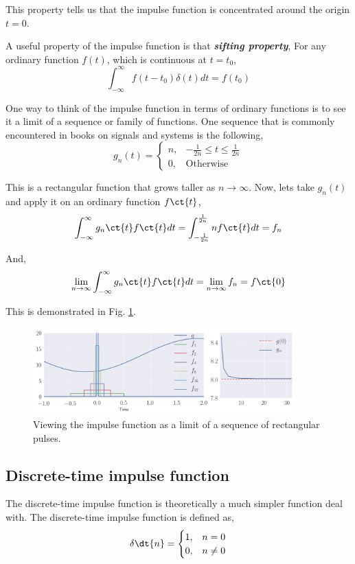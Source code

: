 This property tells us that the impulse function is concentrated around the origin $t = 0$. 

A useful property of the impulse function is that \textit{\textbf{sifting property}}, For any ordinary function $f\left(t\right)$, which is continuous at $t = t_0$,
\[ \int_{-\infty}^{\infty}f\left(t - t_0\right)\delta\left(t\right)dt = f\left(t_0\right) \]

One way to think of the impulse function in terms of ordinary functions is to see it a limit of a sequence or family of functions. One sequence that is commonly encountered in books on signals and systems is the following,
\[ g_{n}\left(t\right) =    
\begin{cases}
n, & -\frac{1}{2n} \leq t \leq \frac{1}{2n} \\
0, & \mathrm{Otherwise}
\end{cases}
\]

This is a rectangular function that grows taller as $n \to \infty$. Now, lets take $g_{n}\left(t\right)$ and apply it on an ordinary function $f\ct{t}$,
\[ \int_{-\infty}^{\infty}g_{n}\ct{t}f\ct{t}dt = \int_{-\frac{1}{2n}}^{\frac{1}{2n}}nf\ct{t}dt = f_n \]

And,
\[ \lim_{n\to\infty}\int_{-\infty}^{\infty}g_{n}\ct{t}f\ct{t}dt = \lim_{n\to\infty}f_n = f\ct{0} \]

This is demonstrated in Fig. \ref{fig:ch2-impsifseq}.

\begin{figure}[h]
    \centering
    \includegraphics[width=0.9\textwidth]{figs/ch2-impulsesift.png}
    \caption{Viewing the impulse function as a limit of a sequence of rectangular pulses.}
    \label{fig:ch2-impsifseq}
\end{figure}

\subsection{Discrete-time impulse function}
The discrete-time impulse function is theoretically a much simpler function deal with. The discrete-time impulse function is defined as,
\[ \delta\dt{n} = 
\begin{cases}
    1, & n = 0 \\
    0, & n \neq 0
\end{cases}
\]

